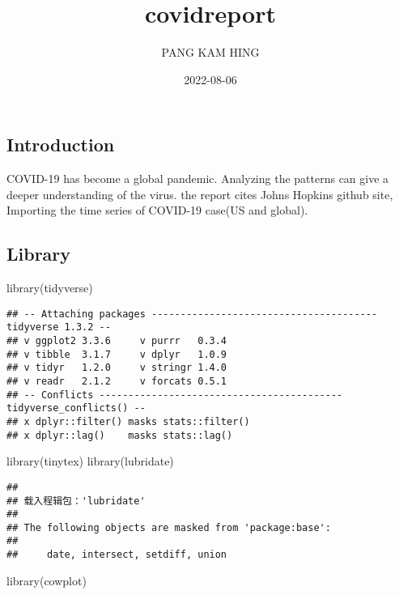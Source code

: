 \documentclass[
]{article}
\title{covidreport}
\author{PANG KAM HING}
\date{2022-08-06}
\newenvironment{Shaded}{\begin{snugshade}}{\end{snugshade}}
\newcommand{\FunctionTok}[1]{\textcolor[rgb]{0.00,0.00,0.00}{#1}}
\newcommand{\NormalTok}[1]{#1}
\begin{document}
\maketitle

\hypertarget{introduction}{%
\subsection{Introduction}\label{introduction}}

COVID-19 has become a global pandemic. Analyzing the patterns can give a
deeper understanding of the virus. the report cites Johns Hopkins github
site, Importing the time series of COVID-19 case(US and global).

\hypertarget{library}{%
\subsection{Library}\label{library}}

\begin{Shaded}
\begin{Highlighting}[]
\FunctionTok{library}\NormalTok{(tidyverse)}
\end{Highlighting}
\end{Shaded}

\begin{verbatim}
## -- Attaching packages --------------------------------------- tidyverse 1.3.2 --
## v ggplot2 3.3.6     v purrr   0.3.4
## v tibble  3.1.7     v dplyr   1.0.9
## v tidyr   1.2.0     v stringr 1.4.0
## v readr   2.1.2     v forcats 0.5.1
## -- Conflicts ------------------------------------------ tidyverse_conflicts() --
## x dplyr::filter() masks stats::filter()
## x dplyr::lag()    masks stats::lag()
\end{verbatim}

\begin{Shaded}
\begin{Highlighting}[]
\FunctionTok{library}\NormalTok{(tinytex)}
\FunctionTok{library}\NormalTok{(lubridate)}
\end{Highlighting}
\end{Shaded}

\begin{verbatim}
## 
## 载入程辑包：'lubridate'
## 
## The following objects are masked from 'package:base':
## 
##     date, intersect, setdiff, union
\end{verbatim}

\begin{Shaded}
\begin{Highlighting}[]
\FunctionTok{library}\NormalTok{(cowplot)}
\end{Highlighting}
\end{Shaded}
\end{document}
